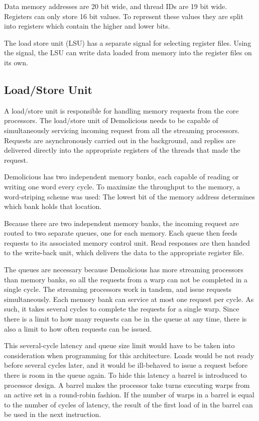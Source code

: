 \documentclass[../main/report.tex]{subfiles}
\begin{document}
Data memory addresses are 20 bit wide, and thread IDs are 19 bit wide.
Registers can only store 16 bit values.	
To represent these values they are split into registers which contain the higher and lower bits.

The load store unit (LSU) has a separate signal for selecting register files.
Using the signal, the LSU can write data loaded from memory into the register files on its own.


\subsection{Load/Store Unit}
A load/store unit is responsible for handling memory requests from the core processors.
The load/store unit of Demolicious needs to be capable of simultaneously servicing incoming request from all the streaming processors.
Requests are asynchronously carried out in the background, and replies are delivered directly into the appropriate registers of the threads that made the request.

Demolicious has two independent memory banks, each capable of reading or writing one word every cycle.
To maximize the throughput to the memory, a word-striping scheme was used:
The lowest bit of the memory address determines which bank holds that location.

Because there are two independent memory banks, the incoming request are routed to two separate queues, one for each memory.
Each queue then feeds requests to its associated memory control unit.
Read responses are then handed to the write-back unit, which delivers the data to the appropriate register file.

The queues are necessary because Demolicious has more streaming processors than memory banks, so all the requests from a warp can not be completed in a single cycle.
The streaming processors work in tandem, and issue requests simultaneously.
Each memory bank can service at most one request per cycle.
As such, it takes several cycles to complete the requests for a single warp.
Since there is a limit to how many requests can be in the queue at any time, there is also a limit to how often requests can be issued.

This several-cycle latency and queue size limit would have to be taken into consideration when programming for this architecture.
Loads would be not ready before several cycles later, and it would be ill-behaved to issue a request before there is room in the queue again.
To hide this latency a barrel is introduced to processor design.
A barrel makes the processor take turns executing warps from an active set in a round-robin fashion.
If the number of warps in a barrel is equal to the number of cycles of latency, the result of the first load of in the barrel can be used in the next instruction.
\end{document}

